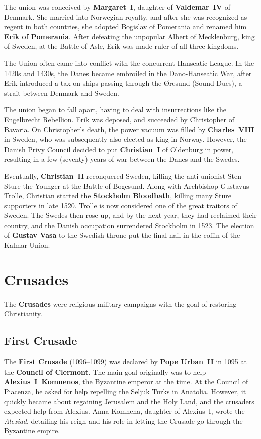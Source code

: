 The union was conceived by \textbf{Margaret~I}, daughter of \textbf{Valdemar~IV} of Denmark.
She married into Norwegian royalty, and after she was recognized as regent in both countries,
she adopted Bogislav of Pomerania and renamed him \textbf{Erik of Pomerania}.
After defeating the unpopular Albert of Mecklenburg, king of Sweden, at the Battle of Asle,
Erik was made ruler of all three kingdoms.

The Union often came into conflict with the concurrent Hanseatic League.
In the 1420s and 1430s, the Danes became embroiled in the Dano-Hanseatic War,
after Erik introduced a tax on ships passing through the \O{}resund (Sound Dues), a strait between Denmark and Sweden.

The union began to fall apart, having to deal with insurrections like the Engelbrecht Rebellion.
Erik was deposed, and succeeded by Christopher of Bavaria.
On Christopher's death, the power vacuum was filled by \textbf{Charles~VIII} in Sweden,
who was subsequently also elected as king in Norway.
However, the Danish Privy Council decided to put \textbf{Christian~I} of Oldenburg in power,
resulting in a few (seventy) years of war between the Danes and the Swedes.

Eventually, \textbf{Christian~II} reconquered Sweden,
killing the anti-unionist Sten Sture the Younger at the Battle of Bogesund.
Along with Archbishop Gustavus Trolle,
Christian started the \textbf{Stockholm Bloodbath}, killing many Sture supporters in late 1520.
Trolle is now considered one of the great traitors of Sweden.
The Swedes then rose up, and by the next year,
they had reclaimed their country, and the Danish occupation surrendered Stockholm in 1523.
The election of \textbf{Gustav Vasa} to the Swedish throne put the final nail in the coffin of the Kalmar Union.

\section{Crusades}

The \textbf{Crusades} were religious military campaigns with the goal of restoring Christianity.

\subsection*{First Crusade}

The \textbf{First Crusade} (1096--1099) was declared by \textbf{Pope Urban~II}
in 1095 at the \textbf{Council of Clermont}.
The main goal originally was to help \textbf{Alexius~I~Komnenos}, the Byzantine emperor at the time.
At the Council of Piacenza, he asked for help repelling the Seljuk Turks in Anatolia.
However, it quickly became about regaining Jerusalem and the Holy Land,
and the crusaders expected help from Alexius.
Anna Komnena, daughter of Alexius~I, wrote the \textit{Alexiad},
detailing his reign and his role in letting the Crusade go through the Byzantine empire.

